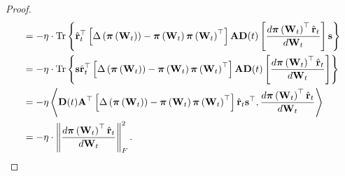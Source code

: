 \begin{proof}
\begin{equation*}
\begin{split}
    &= - \eta \cdot \operatorname*{Tr} \left\{ \hat{{\mathbf{r}}}_t^\top \left[\Delta\left( {\boldsymbol{\pi}}\left( {\mathbf{W}}_t \right) \right) - {\boldsymbol{\pi}}\left( {\mathbf{W}}_t \right) {\boldsymbol{\pi}}\left( {\mathbf{W}}_t \right)^\top \right] {\mathbf{A}} {\mathbf{D}}(t) \left[ \frac{d {\boldsymbol{\pi}}\left({\mathbf{W}}_t\right)^\top \hat{{\mathbf{r}}}_t}{d {\mathbf{W}}_t} \right] {\mathbf{s}} \right\} \\
    &= - \eta \cdot \operatorname*{Tr} \left\{ {\mathbf{s}} \hat{{\mathbf{r}}}_t^\top \left[\Delta\left( {\boldsymbol{\pi}}\left( {\mathbf{W}}_t \right) \right) - {\boldsymbol{\pi}}\left( {\mathbf{W}}_t \right) {\boldsymbol{\pi}}\left( {\mathbf{W}}_t \right)^\top \right] {\mathbf{A}} {\mathbf{D}}(t) \left[ \frac{d {\boldsymbol{\pi}}\left({\mathbf{W}}_t\right)^\top \hat{{\mathbf{r}}}_t}{d {\mathbf{W}}_t} \right]  \right\} \\
    &= - \eta \left\langle {\mathbf{D}}(t) {\mathbf{A}}^\top \left[\Delta\left( {\boldsymbol{\pi}}\left( {\mathbf{W}}_t \right) \right) - {\boldsymbol{\pi}}\left( {\mathbf{W}}_t \right) {\boldsymbol{\pi}}\left( {\mathbf{W}}_t \right)^\top \right] \hat{{\mathbf{r}}}_t {\mathbf{s}}^\top, \frac{d {\boldsymbol{\pi}}\left({\mathbf{W}}_t\right)^\top \hat{{\mathbf{r}}}_t}{d {\mathbf{W}}_t} \right\rangle \\
    &= - \eta \cdot \left\| \frac{d {\boldsymbol{\pi}}\left({\mathbf{W}}_t\right)^\top \hat{{\mathbf{r}}}_t}{d {\mathbf{W}}_t} \right\|_F^2. \qedhere
\end{split}
\end{equation*}
\end{proof}

